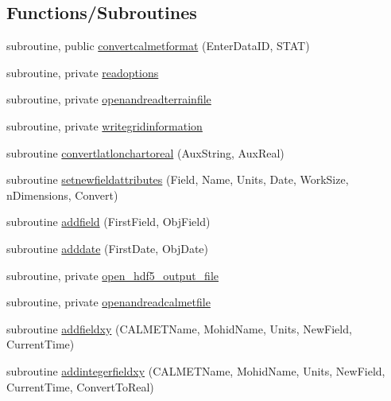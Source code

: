 \subsection*{Functions/\+Subroutines}
\begin{DoxyCompactItemize}
\item 
subroutine, public \mbox{\hyperlink{namespacemodulecalmetformat_a46e7b8dbd76c834dd87aa502fa427ecf}{convertcalmetformat}} (Enter\+Data\+ID, S\+T\+AT)
\item 
subroutine, private \mbox{\hyperlink{namespacemodulecalmetformat_a93959f38b7542f55aa7f2b9557c7ee20}{readoptions}}
\item 
subroutine, private \mbox{\hyperlink{namespacemodulecalmetformat_a1c6e763c6740cd630346ca11aab5aa78}{openandreadterrainfile}}
\item 
subroutine, private \mbox{\hyperlink{namespacemodulecalmetformat_aed24d711f305ad0c21d58e0ff79c9c02}{writegridinformation}}
\item 
subroutine \mbox{\hyperlink{namespacemodulecalmetformat_a4d48e68e591262be2fdee84257034418}{convertlatlonchartoreal}} (Aux\+String, Aux\+Real)
\item 
subroutine \mbox{\hyperlink{namespacemodulecalmetformat_a14590292a4c7892fcd59f55007069444}{setnewfieldattributes}} (Field, Name, Units, Date, Work\+Size, n\+Dimensions, Convert)
\item 
subroutine \mbox{\hyperlink{namespacemodulecalmetformat_ad719aec457312263662ee69e4ff227fb}{addfield}} (First\+Field, Obj\+Field)
\item 
subroutine \mbox{\hyperlink{namespacemodulecalmetformat_ac2b80a87e09960dca9aab0ddc8af00b5}{adddate}} (First\+Date, Obj\+Date)
\item 
subroutine, private \mbox{\hyperlink{namespacemodulecalmetformat_a08504fdf416abe46eab39f11e6104b74}{open\+\_\+hdf5\+\_\+output\+\_\+file}}
\item 
subroutine, private \mbox{\hyperlink{namespacemodulecalmetformat_a5ff4d55d88eac5ea8ceee14dbc6c26af}{openandreadcalmetfile}}
\item 
subroutine \mbox{\hyperlink{namespacemodulecalmetformat_a620b75749d8d431ee5f1c9152211ebb0}{addfieldxy}} (C\+A\+L\+M\+E\+T\+Name, Mohid\+Name, Units, New\+Field, Current\+Time)
\item 
subroutine \mbox{\hyperlink{namespacemodulecalmetformat_a26c3210caedd039907d56c2a6b8d30c4}{addintegerfieldxy}} (C\+A\+L\+M\+E\+T\+Name, Mohid\+Name, Units, New\+Field, Current\+Time, Convert\+To\+Real)
\item 

\end{DoxyCompactItemize}
